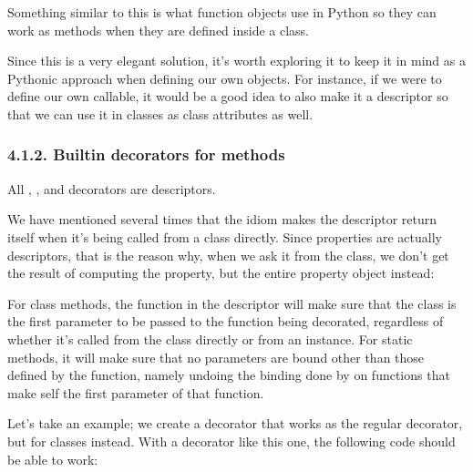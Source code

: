 \documentclass[a4paper,10pt,english]{sphinxmanual}
\begin{document}
Something similar to this is what function objects use in Python so they can work as
methods when they are defined inside a class.

Since this is a very elegant solution, it’s worth exploring it to keep it in mind as a Pythonic
approach when defining our own objects. For instance, if we were to define our own
callable, it would be a good idea to also make it a descriptor so that we can use it in classes
as class attributes as well.


\subsubsection{4.1.2. Built\sphinxhyphen{}in decorators for methods}
\label{\detokenize{chapters/6_descriptors/index:built-in-decorators-for-methods}}
All , , and  decorators are descriptors.

We have mentioned several times that the idiom makes the descriptor return itself when it’s
being called from a class directly. Since properties are actually descriptors, that is the
reason why, when we ask it from the class, we don’t get the result of computing the
property, but the entire property object instead:

\begin{sphinxVerbatim}[commandchars=\\\{\}]
 
    
      
\end{sphinxVerbatim}

For class methods, the  function in the descriptor will make sure that the class is
the first parameter to be passed to the function being decorated, regardless of whether it’s
called from the class directly or from an instance. For static methods, it will make sure that
no parameters are bound other than those defined by the function, namely undoing the
binding done by  on functions that make self the first parameter of that
function.

Let’s take an example; we create a  decorator that works as the regular
 decorator, but for classes instead. With a decorator like this one, the following
code should be able to work:
\end{document}
